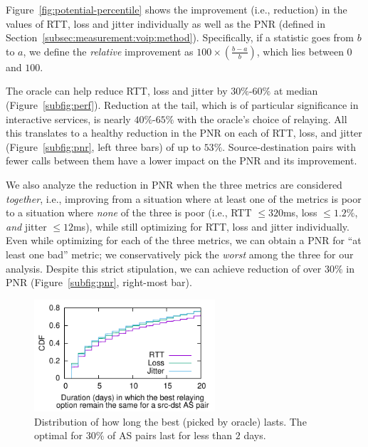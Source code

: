  Figure~\ref{fig:potential-percentile} shows the improvement (i.e., reduction) in the values of RTT, loss and jitter individually as well as the PNR (defined in Section~\ref{subsec:measurement:voip:method}). Specifically, if 
a statistic goes from  $b$ to $a$, we define the {{\em relative}} improvement as $100 \times (\frac{b-a}{b})$, which lies between $0$ and $100$. %

The oracle can help reduce RTT, loss and jitter by $30\%$-$60\%$ at median (Figure~\ref{subfig:perf}). Reduction at the tail, which is of particular significance in interactive services,
is nearly  $40\%$-$65\%$ with the oracle's choice of relaying. All this translates to a healthy reduction in the PNR on each of RTT, loss, and jitter (Figure~\ref{subfig:pnr}, left three bars) of up to $53\%$. Source-destination pairs with fewer calls between them have a lower impact on the PNR and its improvement. 

We also analyze the reduction in PNR when the three metrics are considered {\em together}, i.e., improving from a situation where at least one of the metrics is poor to a situation where {\em none} of the three is poor (i.e., RTT $\leq 320$ms, loss $\leq 1.2\%$, {\em and} jitter $\leq 12$ms), while still optimizing for RTT, loss and jitter individually. %
Even while optimizing for each of the three metrics, we can obtain a PNR for ``at least one bad'' metric; we conservatively pick the {\em worst} among the three for our analysis. Despite this strict stipulation, we can achieve reduction of over $30\%$ in PNR (Figure~\ref{subfig:pnr}, right-most bar).

\begin{figure}[t!]
\centering
\includegraphics[width=0.6\textwidth]{figures/Via-Potential-PersistenceOfOracleDecision.pdf}
\caption{Distribution of how long the best \option (picked by oracle) lasts. The optimal \options for $30\%$ of AS pairs last for less than $2$ days.}
\label{fig:potential-persistence}
\end{figure}

